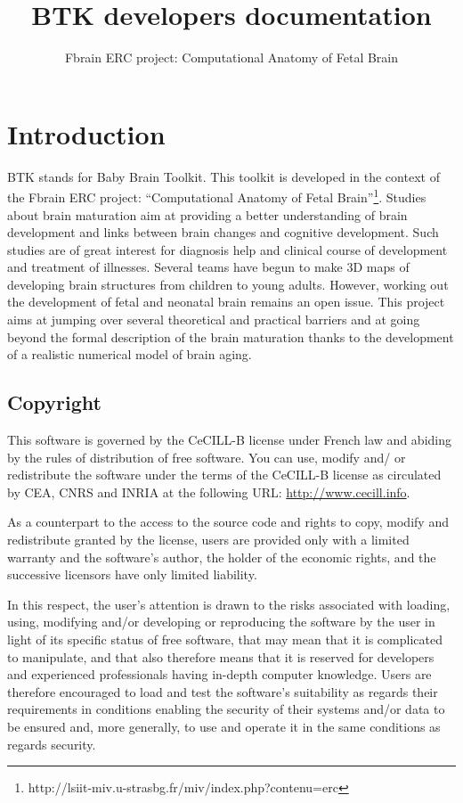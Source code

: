 \documentclass[a4paper,10pt]{article}
\title{BTK developers documentation}
\author{Fbrain ERC project: Computational Anatomy of Fetal Brain}
\begin{document}
  \maketitle
  \tableofcontents

  \section{Introduction}

  BTK stands for Baby Brain Toolkit. This toolkit is developed in the context of
  the Fbrain ERC project: ``Computational Anatomy of Fetal
  Brain''\footnote{http://lsiit-miv.u-strasbg.fr/miv/index.php?contenu=erc}. 
  Studies about brain maturation aim at providing a better understanding of brain
  development and links between brain changes and cognitive development. Such
  studies are of great interest for diagnosis help and clinical course of
  development and treatment of illnesses. Several teams have begun to make 3D maps
  of developing brain structures from children to young adults. However, working
  out the development of fetal and neonatal brain remains an open issue. This
  project aims at jumping over several theoretical and practical barriers and at
  going beyond the formal description of the brain maturation thanks to the
  development of a realistic numerical model of brain aging.

  \subsection{Copyright}
  This software is governed by the CeCILL-B license under French law and
  abiding by the rules of distribution of free software.  You can  use, 
  modify and/ or redistribute the software under the terms of the CeCILL-B
  license as circulated by CEA, CNRS and INRIA at the following URL: \url{http://www.cecill.info}. 

  As a counterpart to the access to the source code and rights to copy,
  modify and redistribute granted by the license, users are provided only
  with a limited warranty  and the software's author,  the holder of the
  economic rights,  and the successive licensors  have only  limited
  liability. 

  In this respect, the user's attention is drawn to the risks associated
  with loading,  using,  modifying and/or developing or reproducing the
  software by the user in light of its specific status of free software,
  that may mean  that it is complicated to manipulate,  and  that  also
  therefore means  that it is reserved for developers  and  experienced
  professionals having in-depth computer knowledge. Users are therefore
  encouraged to load and test the software's suitability as regards their
  requirements in conditions enabling the security of their systems and/or 
  data to be ensured and,  more generally, to use and operate it in the 
  same conditions as regards security. 
\end{document}
